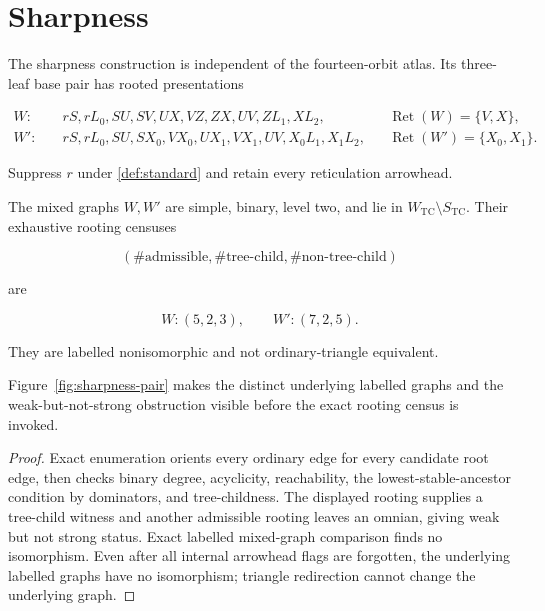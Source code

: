 \section{Sharpness}\label{sec:sharpness}

The sharpness construction is independent of the fourteen-orbit atlas.  Its
three-leaf base pair has rooted presentations

\begin{align*}
W:\quad& rS,rL_0,SU,SV,UX,VZ,ZX,UV,ZL_1,XL_2,
 &&\operatorname{Ret}(W)=\{V,X\},\\
W':\quad& rS,rL_0,SU,SX_0,VX_0,UX_1,VX_1,UV,X_0L_1,X_1L_2,
 &&\operatorname{Ret}(W')=\{X_0,X_1\}.
\end{align*}

Suppress \(r\) under \cref{def:standard} and retain every reticulation
arrowhead.

\begin{proposition}\label{prop:sharp-topology}
The mixed graphs \(W,W'\) are simple, binary, level two, and lie in
\(W_{\mathrm{TC}}\setminus S_{\mathrm{TC}}\).  Their exhaustive rooting
censuses

\[
 (\#\mathrm{admissible},\#\mathrm{tree\mbox{-}child},
   \#\mathrm{non\mbox{-}tree\mbox{-}child})
\]

are

\[
 W:(5,2,3),\qquad W':(7,2,5).
\]

They are labelled nonisomorphic and not ordinary-triangle equivalent.
\end{proposition}



Figure~\ref{fig:sharpness-pair} makes the distinct underlying labelled graphs
and the weak-but-not-strong obstruction visible before the exact rooting
census is invoked.

\begin{proof}
Exact enumeration orients every ordinary edge for every candidate root edge,
then checks binary degree, acyclicity, reachability, the lowest-stable-ancestor
condition by dominators, and tree-childness.  The displayed rooting supplies
a tree-child witness and another admissible rooting leaves an omnian, giving
weak but not strong status.  Exact labelled mixed-graph comparison finds no
isomorphism.  Even after all internal arrowhead flags are forgotten, the
underlying labelled graphs have no isomorphism; triangle redirection cannot
change the underlying graph.
\end{proof}

